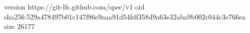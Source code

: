 version https://git-lfs.github.com/spec/v1
oid sha256:529a478497b01c147f86e9aaa91d54fdf358d9a63e32aba9b002c044c3e766ea
size 26177
